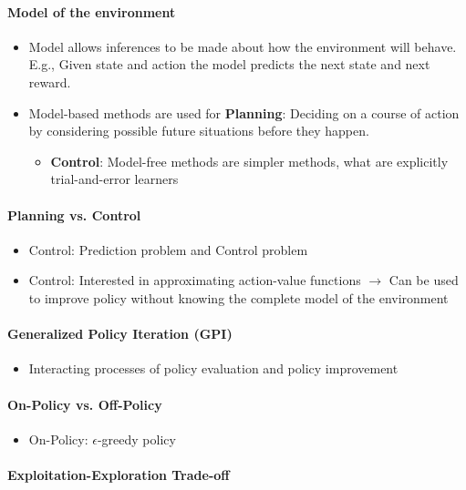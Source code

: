 \documentclass[a4paper, twoside, 12pt]{article}
\begin{document}
\paragraph{Model of the environment}
\label{sec:org183ff93}
\begin{itemize}
\item Model allows inferences to be made about how the environment will behave.
E.g., Given state and action the model predicts the next state and next reward.
\item Model-based methods are used for \textbf{\textbf{Planning}}: Deciding on a course of action by
considering possible future situations before they happen.
\begin{itemize}
\item \textbf{\textbf{Control}}: Model-free methods are simpler methods, what are explicitly trial-and-error learners
\end{itemize}
\end{itemize}

\paragraph{Planning vs. Control}
\label{sec:org16d931e}
\begin{itemize}
\item Control: Prediction problem and Control problem
\item Control: Interested in approximating action-value functions
\(\rightarrow\) Can be used to improve policy without knowing the complete model of
the environment
\end{itemize}

\paragraph{Generalized Policy Iteration (GPI)}
\label{sec:org032f05b}
\begin{itemize}
\item Interacting processes of policy evaluation and policy improvement
\end{itemize}
\paragraph{On-Policy vs. Off-Policy}
\label{sec:orgac81bd5}
\begin{itemize}
\item On-Policy: \(\epsilon\)-greedy policy
\end{itemize}
\paragraph{Exploitation-Exploration Trade-off}
\label{sec:org5bb0adf}
\end{document}
